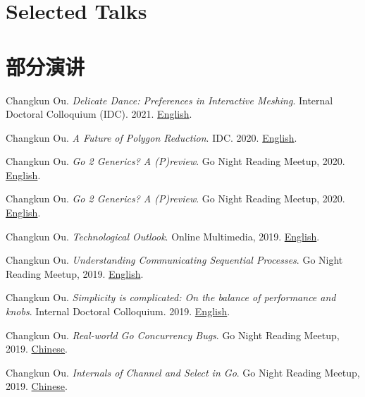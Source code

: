  {
  \section{\textbf{Selected Talks}}
}{
  \section{\textbf{部分演讲}}
}

\resumeSubHeadingListStart
    \item{
      Changkun Ou.
      \emph{Delicate Dance: Preferences in Interactive Meshing}.
      Internal Doctoral Colloquium (IDC). 2021. \href{https://changkun.de/s/polyred5star}{English}.
    }
    \item{
      Changkun Ou.
      \emph{A Future of Polygon Reduction}.
      IDC. 2020. \href{https://changkun.de/s/polyred4us}{English}.
    }
    \item{
      Changkun Ou.
      \emph{Go 2 Generics? A (P)review}.
      Go Night Reading Meetup, 2020. \href{https://github.com/changkun/talks/blob/master/202003/go2generics.pdf}{English}.
    }
    \item{
      Changkun Ou.
      \emph{Go 2 Generics? A (P)review}.
      Go Night Reading Meetup, 2020. \href{https://github.com/changkun/talks/blob/master/202003/go2generics.pdf}{English}.
    }
    \item{
      Changkun Ou.
      \emph{Technological Outlook}.
      Online Multimedia, 2019. \href{https://github.com/changkun/talks/blob/master/201912/omm9.pdf}{English}.
    }
    \item{
      Changkun Ou.
      \emph{Understanding Communicating Sequential Processes}.
      Go Night Reading Meetup, 2019. \href{https://github.com/changkun/talks/blob/master/201911/csp.pdf}{English}.
    }
    \item{
      Changkun Ou.
      \emph{Simplicity is complicated: On the balance of performance and knobs}.
      Internal Doctoral Colloquium. 2019. \href{https://github.com/changkun/talks/blob/master/201910/knobs.pdf}{English}.
    }
    \item{
      Changkun Ou.
      \emph{Real-world Go Concurrency Bugs}.
      Go Night Reading Meetup, 2019. \href{https://github.com/changkun/talks/blob/master/201908/channel.pdf}{Chinese}.
    }
    \item{
      Changkun Ou.
      \emph{Internals of Channel and Select in Go}.
      Go Night Reading Meetup, 2019. \href{https://github.com/changkun/talks/blob/master/201908/channel.pdf}{Chinese}.
    }
